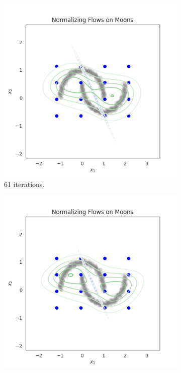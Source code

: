 \documentclass[shortabstract]{iithesis}
\begin{document}
\begin{figure}
    \begin{subfigure}{0.32\textwidth}
    \includegraphics[scale=0.35]{flow_on_moons_6_penalty=0_grid.png}
    \caption{ 61 iterations.}
    \end{subfigure}
    \begin{subfigure}{0.32\textwidth}
    \includegraphics[scale=0.35]{flow_on_moons_7_penalty=0_grid.png}

\end{subfigure}
\end{figure}
\end{document}
